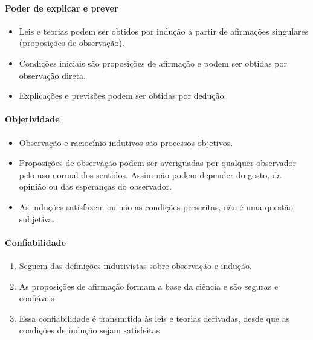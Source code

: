 \documentclass[9pt,a4paper]{extarticle}
\begin{document}
\paragraph{Poder de explicar e prever}

\begin{itemize}
    \item Leis e teorias podem ser obtidos por indução a partir de afirmações singulares (proposições de observação).
    \item Condições iniciais são proposições de afirmação e podem ser obtidas por observação direta.
    \item Explicações e previsões podem ser obtidas por dedução.
\end{itemize}

\paragraph{Objetividade}

\begin{itemize}
    \item Observação e raciocínio indutivos são processos objetivos.
    \item Proposições de observação podem ser averiguadas por qualquer observador pelo uso normal dos sentidos. Assim não podem depender do gosto, da opinião ou das esperanças do observador. 
    \item As induções satisfazem ou não as condições prescritas, não é uma questão subjetiva.
\end{itemize}

\paragraph{Confiabilidade}

\begin{enumerate}
    \item Seguem das definições indutivistas sobre observação e indução. 
    \item As proposições de afirmação formam a base da ciência e são seguras e confiáveis 
    \item Essa confiabilidade é transmitida às leis e teorias derivadas, desde que as condições de indução sejam satisfeitas
\end{enumerate}


   

\end{document}
